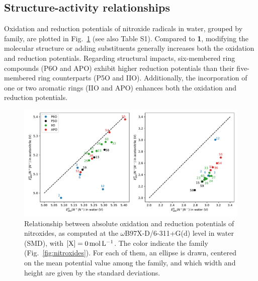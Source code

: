 \documentclass[review]{elsarticle}
\begin{document}
\subsection{Structure-activity relationships}


Oxidation and reduction potentials of nitroxide radicals in water, grouped by family, are plotted in Fig.~\ref{fig:family} (see also Table S1). Compared to \textbf{1}, modifying the molecular structure or adding substituents generally increases both the oxidation and reduction potentials. Regarding structural impacts, six-membered ring compounds (P6O and APO) exhibit higher reduction potentials than their five-membered ring counterparts (P5O and IIO). Additionally, the incorporation of one or two aromatic rings (IIO and APO) enhances both the oxidation and reduction potentials.


\begin{figure}[!h]
	\centering
	\includegraphics[width=.9\linewidth]{Figure7}
	\caption{Relationship between absolute oxidation and reduction potentials of nitroxides, as computed at the $\omega$B97X-D/6-311+G(d) level in water (SMD), with $[\ce{X}]=\SI{0}{\mole\per\liter}$. The color indicate the family (Fig.~\ref{fig:nitroxides}). For each of them, an ellipse is drawn, centered on the mean potential value among the family, and which width and height are given by the standard deviations.}
	\label{fig:family}
\end{figure}
\end{document}
